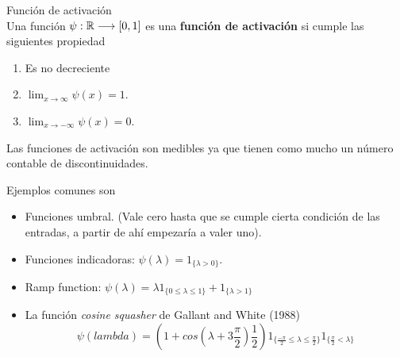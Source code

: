 \begin{definicion} Función de activación \\
    Una función  $\psi: \mathbb{R} \longrightarrow [0,1]$ es una \textbf{ función de activación} si  cumple las siguientes propiedad
    \begin{enumerate}[label=(\roman*)]
        \item Es no decreciente
        \item $\lim _{x \rightarrow \infty} \psi(x) = 1
        $.
        \item $\lim _{x \rightarrow -\infty} \psi(x) = 0$.
    \end{enumerate}  

    Las funciones de activación son medibles ya que tienen como mucho un número contable de discontinuidades.
   
    Ejemplos comunes son
    \begin{itemize}
        \item Funciones umbral. 
        (Vale cero hasta que se cumple cierta condición de las entradas, a partir de ahí empezaría a valer uno).

        \item Funciones indicadoras: $\psi(\lambda) = 1_{\{\lambda > 0\}}$. 
        \item Ramp function: $\psi(\lambda)  = \lambda 1_{\{0 \leq \lambda \leq  1\}} + 1_{\{\lambda > 1\}}$
    
        \item La función \textit{cosine squasher} de Gallant and White (1988)
        \begin{equation*}
    \psi(lambda )= (1 + cos(\lambda + 3 \frac{\pi}{2}) \frac{1}{2}) 
     1_{\{\frac{-\pi}{2} \leq \lambda \leq  \frac{\pi}{2}\}}
     1_{\{ \frac{\pi}{2} < \lambda \}}
    \end{equation*}
    \end{itemize}
    
\end{definicion}